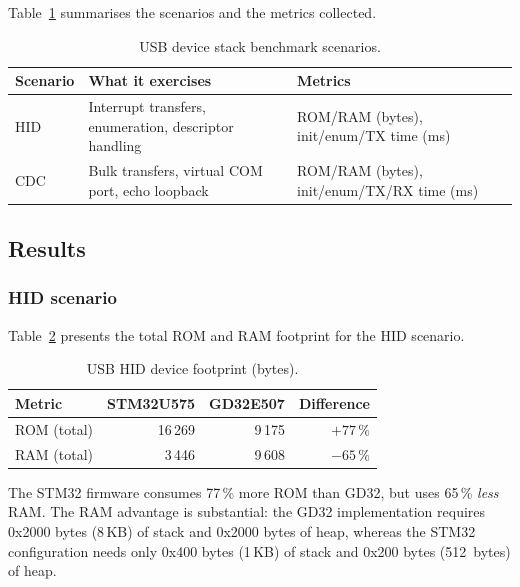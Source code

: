 Table~\ref{tab:gd32-usb-scenarios} summarises the scenarios and the metrics collected.

\begin{table}[H]
  \centering
  \caption{USB device stack benchmark scenarios.}
  \label{tab:gd32-usb-scenarios}
  \begin{tabularx}{\textwidth}{l X l}
    \toprule
    \textbf{Scenario} & \textbf{What it exercises} & \textbf{Metrics} \\
    \midrule
    HID  & Interrupt transfers, enumeration, descriptor handling
         & ROM/RAM (bytes), init/enum/TX time (ms) \\
    CDC  & Bulk transfers, virtual COM port, echo loopback
         & ROM/RAM (bytes), init/enum/TX/RX time (ms) \\
    \bottomrule
  \end{tabularx}
\end{table}

\subsection{Results}
\label{sec:gd32-usb-results}

\subsubsection{HID scenario}
\label{sec:gd32-usb-hid}

Table~\ref{tab:gd32-usb-hid-footprint} presents the total ROM and RAM footprint for the
HID scenario.

\begin{table}[H]
  \centering
  \caption{USB HID device footprint (bytes).}
  \label{tab:gd32-usb-hid-footprint}
  \begin{tabular}{l r r r}
    \toprule
    \textbf{Metric} & \textbf{STM32U575} & \textbf{GD32E507} & \textbf{Difference} \\
    \midrule
    ROM (total) & 16\,269 & 9\,175  & $+77\,\%$ \\
    RAM (total) & 3\,446  & 9\,608  & $-65\,\%$ \\
    \bottomrule
  \end{tabular}
\end{table}

The STM32 firmware consumes 77\,\% more ROM than GD32, but uses 65\,\% \emph{less} RAM.
The RAM advantage is substantial: the GD32 implementation requires 0x2000 bytes (8\,KB) of
stack and 0x2000 bytes of heap, whereas the STM32 configuration needs only 0x400 bytes
(1\,KB) of stack and 0x200 bytes (512~bytes) of heap.

